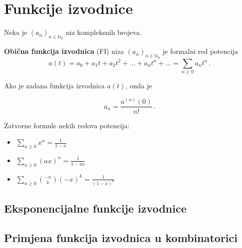 \section{Funkcije izvodnice}

Neka je $(a_n)_{n\in\mathbb{N}_0}$ niz kompleksnih brojeva.

\textbf{Obična funkcija izvodnica} (FI) niza $(a_n)_{n\in\mathbb{N}_0}$ je formalni red potencija
$$
    a(t) = a_0 + a_1t+a_2t^2 + \dots + a_nt^n+\dots = \sum_{n \geq 0} a_nt^n\,.
$$

Ako je zadana funkcija izvodnica $a(t)$, onda je

$$
a_n = \frac{a^{(n)}(0)}{n!}\,.
$$

Zatvorne formule nekih redova potencija:

\begin{itemize}
    \item $\sum_{n\geq 0} x^n = \frac{1}{1-x}$
    \item $\sum_{n\geq 0} (ax)^n = \frac{1}{1-ax}$
    \item $\sum_{n\geq 0} \binom{-n}{k}(-x)^k = \frac{1}{(1-x)^n}$
\end{itemize}

\subsection{Eksponencijalne funkcije izvodnice}
\subsection{Primjena funkcija izvodnica u kombinatorici}
